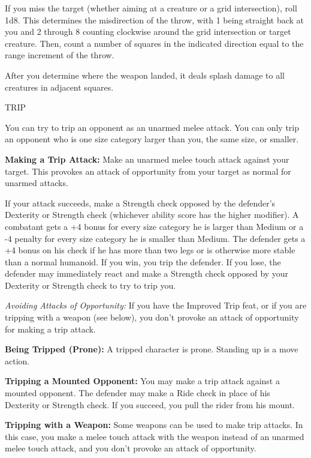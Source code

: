 \documentclass{article}
\begin{document}
If you miss the target (whether aiming at a creature or a grid intersection), roll 
1d8. This determines the misdirection of the throw, with 1 being straight back 
at you and 2 through 8 counting clockwise around the grid intersection or target 
creature. Then, count a number of squares in the indicated direction equal to the 
range increment of the throw.

After you determine where the weapon landed, it deals splash damage to all creatures 
in adjacent squares.

\vspace{12pt}
TRIP

You can try to trip an opponent as an unarmed melee attack. You can only trip an 
opponent who is one size category larger than you, the same size, or smaller.

\textbf{Making a Trip Attack:} Make an unarmed melee touch attack against your 
target. This provokes an attack of opportunity from your target as normal for unarmed 
attacks.

If your attack succeeds, make a Strength check opposed by the defender's Dexterity 
or Strength check (whichever ability score has the higher modifier). A combatant 
gets a +4 bonus for every size category he is larger than Medium or a -4 penalty 
for every size category he is smaller than Medium. The defender gets a +4 bonus 
on his check if he has more than two legs or is otherwise more stable than a normal 
humanoid. If you win, you trip the defender. If you lose, the defender may immediately 
react and make a Strength check opposed by your Dexterity or Strength check to 
try to trip you.

\textit{Avoiding Attacks of Opportunity: }If you have the Improved Trip feat, or 
if you are tripping with a weapon (see below), you don't provoke an attack of opportunity 
for making a trip attack.

\textbf{Being Tripped (Prone):} A tripped character is prone. Standing up is a 
move action.

\textbf{Tripping a Mounted Opponent:} You may make a trip attack against a mounted 
opponent. The defender may make a Ride check in place of his Dexterity or Strength 
check. If you succeed, you pull the rider from his mount.

\textbf{Tripping with a Weapon:} Some weapons can be used to make trip attacks. 
In this case, you make a melee touch attack with the weapon instead of an unarmed 
melee touch attack, and you don't provoke an attack of opportunity.
\end{document}
